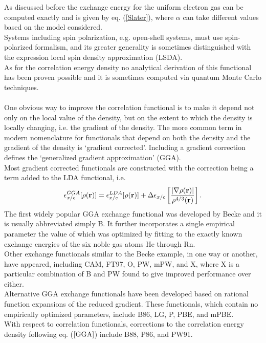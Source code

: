 As discussed before the exchange energy for the uniform electron gas can be computed exactly and is given by eq. (\ref{Slater}), where $\alpha$ can take different values based on the model considered. \\
Systems including spin polarization, e.g. open-shell systems, must use spin-polarized formalism, and its greater generality is sometimes distinguished with the expression local spin density approximation (LSDA). \\
As for the correlation energy density no analytical derivation of this functional has been proven possible and it is sometimes computed via quantum Monte Carlo techniques. \\
\\
One obvious way to improve the correlation functional is to make it depend not only on the local value of the density, but on the extent to which the density is locally changing, i.e. the gradient of the density. The more common term in modern nomenclature for functionals that depend on both the density and the gradient of the density is ‘gradient corrected’. Including a gradient correction defines the ‘generalized gradient approximation’ (GGA). \\
Most gradient corrected functionals are constructed with the correction being a term added to the LDA functional, i.e.
\begin{equation}
    \epsilon_{x/c}^{GGA} [\rho({\bf r})] = \epsilon_{x/c}^{LDA} [\rho({\bf r})] + \Delta \epsilon_{x/c} \left[ \frac{|\nabla \rho({\bf r})|}{\rho^{4/3}({\bf r})} \right]. \label{GGA}
\end{equation}
The first widely popular GGA exchange functional was developed by Becke and it is usually abbreviated simply B. It further incorporates a single empirical parameter the value of which was optimized by fitting to the exactly known exchange energies of the six noble gas atoms He through Rn. \\
Other exchange functionals similar to the Becke example, in one way or another, have appeared, including CAM, FT97, O, PW, mPW, and X, where X is a particular combination of B and PW found to give improved performance over either. \\
Alternative GGA exchange functionals have been developed based on rational function expansions of the reduced gradient. These functionals, which contain no empirically optimized parameters, include B86, LG, P, PBE, and mPBE. \\
With respect to correlation functionals, corrections to the correlation energy density following eq. ($\ref{GGA}$) include B88, P86, and PW91. \\
